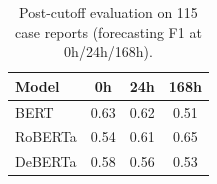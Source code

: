 \begin{table}[htbp]
\caption{Post-cutoff evaluation on 115 case reports (forecasting F1 at 0h/24h/168h).}
\ChSevenTableBodyStart
\begin{ChSevenFloatBody}

\centering
\footnotesize
\setlength{\tabcolsep}{6pt}
\renewcommand{\arraystretch}{1.1}
\begin{tabular}{lccc}
\hline
\textbf{Model} & \textbf{0h} & \textbf{24h} & \textbf{168h} \\
\hline
BERT     & 0.63 & 0.62 & 0.51 \\
RoBERTa  & 0.54 & 0.61 & 0.65 \\
DeBERTa  & 0.58 & 0.56 & 0.53 \\
\hline
\end{tabular}



\end{ChSevenFloatBody}
\end{table}